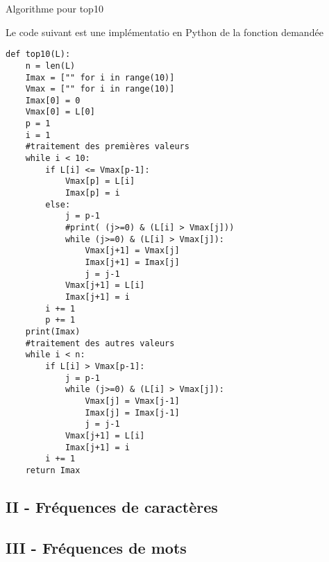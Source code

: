 \begin{enumerate}
\begin{itemize}
\end{itemize}
\begin{algorithm}
  \caption{Algorithme pour top10}
  \label{Cfreqtexte_1}
\end{algorithm}
Le code suivant est une implémentatio en Python de la fonction demandée
\begin{verbatim}
def top10(L):
    n = len(L)
    Imax = ["" for i in range(10)]
    Vmax = ["" for i in range(10)]
    Imax[0] = 0
    Vmax[0] = L[0]
    p = 1
    i = 1
    #traitement des premières valeurs
    while i < 10:
        if L[i] <= Vmax[p-1]:
            Vmax[p] = L[i]
            Imax[p] = i
        else:
            j = p-1
            #print( (j>=0) & (L[i] > Vmax[j]))
            while (j>=0) & (L[i] > Vmax[j]):
                Vmax[j+1] = Vmax[j]
                Imax[j+1] = Imax[j]
                j = j-1
            Vmax[j+1] = L[i]
            Imax[j+1] = i
        i += 1
        p += 1
    print(Imax)
    #traitement des autres valeurs
    while i < n:
        if L[i] > Vmax[p-1]:
            j = p-1
            while (j>=0) & (L[i] > Vmax[j]):
                Vmax[j] = Vmax[j-1]
                Imax[j] = Imax[j-1]
                j = j-1
            Vmax[j+1] = L[i]
            Imax[j+1] = i
        i += 1
    return Imax  
\end{verbatim}

\end{enumerate}

\subsection*{II - Fréquences de caractères}
\subsection*{III - Fréquences de mots}